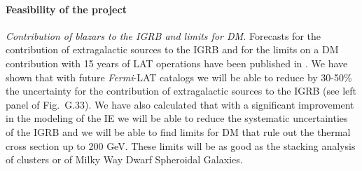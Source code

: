 \documentclass[12 pt]{article}
\begin{document}



\vspace{-0.5cm}
\paragraph{Feasibility of the project}
{\it Contribution of blazars to the IGRB and limits for DM.}
Forecasts for the contribution of extragalactic sources to the IGRB and for the limits on a DM contribution with 15 years of LAT operations have been published in \cite{Charles:2016pgz}.
We have shown that with future {\it Fermi}-LAT catalogs we will be able to reduce by 30-50\% the uncertainty for the contribution of extragalactic sources to the IGRB (see left panel of Fig.~G.33).
We have also calculated that with a significant improvement in the modeling of the IE we will be able to reduce the systematic uncertainties of the IGRB and we will be able to find limits for DM that rule out the thermal cross section up to 200 GeV.
These limits will be as good as the stacking analysis of clusters or of Milky Way Dwarf Spheroidal Galaxies.




\end{document}
